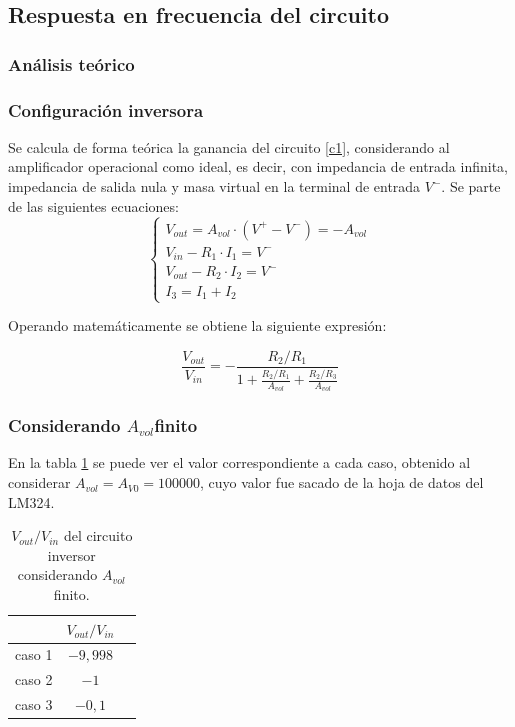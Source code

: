 \subsection{Respuesta en frecuencia del circuito}

\subsubsection{An\'alisis te\'orico} %

\subsubsection*{Configuraci\'on inversora}
Se calcula de forma te\'orica la ganancia del circuito \ref{c1}, 
considerando al amplificador operacional como ideal, es decir, 
con impedancia de entrada infinita, impedancia de salida nula y 
masa virtual en la terminal de entrada $V^{-}$. Se parte de las siguientes ecuaciones:
\begin{equation}
	\begin{cases}
		V_{out} = A_{vol}\cdot(V^+ - V^-) = -A_{vol}\\
		V_{in} - R_1 \cdot I_1 = V^- \\
		V_{out} - R_2 \cdot I_2 = V^-\\ 
		I_3 = I_1 + I_2
	\end{cases}
	\label{ecsbase}
\end{equation}

Operando matem\'aticamente se obtiene la siguiente expresi\'on:

\begin{equation}
	\frac{V_{out}}{V_{in}} = - \frac{R_2/R_1}{1 + \frac{R_2/R_1}{A_{vol}} + \frac{R_2/R_3}{A_{vol}}}
	\label{c1vovi}
\end{equation}

\subsubsection*{Considerando $A_{vol} $finito}
 
En la tabla \ref{avolf} se puede ver el valor correspondiente a cada caso, obtenido al considerar 
$A_{vol} = A_{V0} = 100000$, cuyo valor fue sacado de la hoja de datos del LM324.

\begin{table}[h!]
	\centering
	\begin{tabular}{c c c}%
		\bfseries  & $V_{out}/V_{in}$  \\ \hline
		caso 1 & $-9,998$ \\
		caso 2 & $ -1$ \\
		caso 3 & $ -0,1$ \\
		\hline
	\end{tabular}
	\caption{$V_{out}/V_{in}$ del circuito inversor considerando $A_{vol}$ finito.}
	\label{avolf}
\end{table}

